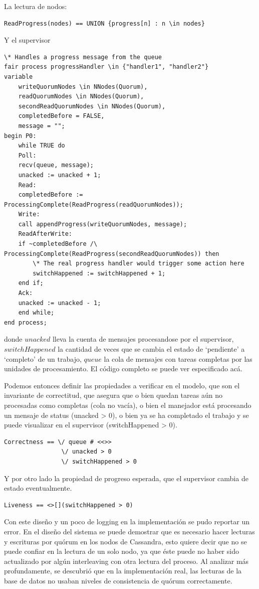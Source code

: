 \documentclass[runningheads]{llncs}
\begin{document}
La lectura de nodos:
\begin{lstlisting}
ReadProgress(nodes) == UNION {progress[n] : n \in nodes}
\end{lstlisting}

Y el supervisor
\begin{lstlisting}
\* Handles a progress message from the queue
fair process progressHandler \in {"handler1", "handler2"}
variable
    writeQuorumNodes \in NNodes(Quorum),
    readQuorumNodes \in NNodes(Quorum),
    secondReadQuorumNodes \in NNodes(Quorum),
    completedBefore = FALSE,
    message = "";
begin P0:
    while TRUE do
    Poll:
    recv(queue, message);
    unacked := unacked + 1;
    Read:
    completedBefore := ProcessingComplete(ReadProgress(readQuorumNodes));
    Write:
    call appendProgress(writeQuorumNodes, message);
    ReadAfterWrite:
    if ~completedBefore /\ ProcessingComplete(ReadProgress(secondReadQuorumNodes)) then
        \* The real progress handler would trigger some action here
        switchHappened := switchHappened + 1;
    end if;
    Ack:
    unacked := unacked - 1;
    end while;
end process;    
\end{lstlisting}

donde $unacked$ lleva la cuenta de mensajes procesandose por el supervisor, $switchHappened$ la cantidad de veces que se cambia el estado de ‘pendiente’ a ‘completo’ de un trabajo, $queue$ la cola de mensajes con tareas completas por las unidades de procesamiento. El código completo se puede ver especificado acá.

Podemos entonces definir las propiedades a verificar en el modelo, que son el invariante de correctitud, que asegura que o bien quedan tareas aún no procesadas como completas (cola no vacía), o bien el manejador está procesando un mensaje de status (unacked > 0), o bien ya se ha completado el trabajo y se puede visualizar en el supervisor (switchHappened > 0).
\begin{lstlisting}
Correctness == \/ queue # <<>>
                \/ unacked > 0
                \/ switchHappened > 0    
\end{lstlisting}

Y por otro lado la propiedad de progreso esperada, que el supervisor cambia de estado eventualmente.

\begin{lstlisting}
Liveness == <>[](switchHappened > 0)
\end{lstlisting}

Con este diseño y un poco de logging en la implementación se pudo reportar un error. En el diseño del sistema se puede demostrar que es necesario hacer lecturas y escrituras por quórum en los nodos de Cassandra, esto quiere decir que no se puede confiar en la lectura de un solo nodo, ya que éste puede no haber sido actualizado por algún interleaving con otra lectura del proceso. Al analizar más profundamente, se descubrió que en la implementación real, las lecturas de la base de datos no usaban niveles de consistencia de quórum correctamente.
\end{document}
